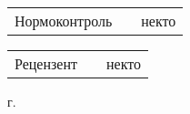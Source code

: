 \documentclass[a4paper]{article}
\begin{document}
\begin{FlushLeft}
{  \vspace{14pt}

  \begin{tabular}{p{6.5cm} p{4.767cm} p{5.633cm}}
    \raggedleft Нормоконтроль & & некто \\
  \end{tabular}

  \vspace{14pt}

  \begin{tabular}{p{6.5cm} p{4.767cm} p{5.633cm}}
    \raggedleft Рецензент & & некто \\
  \end{tabular}
  
}\end{FlushLeft}

\begin{Center}{
\cyrillicfontsf 
\englishfontsf
\fontsize{14pt}{21pt} г.
}\end{Center}
\end{document}

